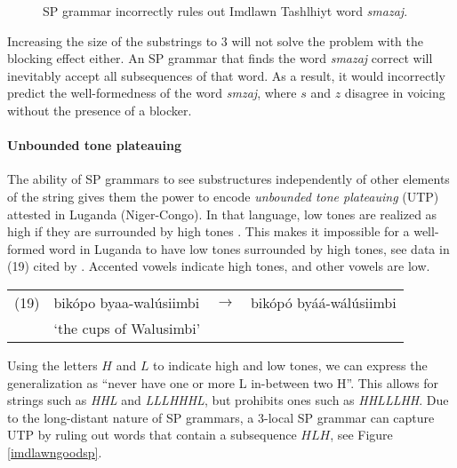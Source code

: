 \begin{figure}[h!]
\begin{center}
\end{center}
\caption{SP grammar incorrectly rules out Imdlawn Tashlhiyt word \emph{sm\textchi azaj}.}
\label{imdlawnbadsp}
\end{figure}

Increasing the size of the substrings to $3$ will not solve the problem with the blocking effect either.
An SP grammar that finds the word \emph{sm\textchi azaj} correct will inevitably accept all subsequences of that word.
As a result, it would incorrectly predict the well-formedness of the word \emph{smzaj}, where $s$ and $z$ disagree in voicing without the presence of a blocker.



\paragraph{Unbounded tone plateauing}
The ability of SP grammars to see substructures independently of other elements of the string gives them the power to encode \emph{unbounded tone plateauing} (UTP) attested in Luganda (Niger-Congo).
In that language, low tones are realized as high if they are surrounded by high tones \citep{HymanKatamba2010}.
This makes it impossible for a well-formed word in Luganda to have low tones surrounded by high tones, see data in (19) cited by \citep{Hyman2011,Jardine2016}.
Accented vowels indicate high tones, and other vowels are low.

\medskip
\begin{tabular}{llcl}
(19) & bik\'opo byaa-wal\'usiimbi & $\rightarrow$ & bik\'op\'o by\'a\'a-w\'al\'usiimbi \\
& `the cups of Walusimbi' &&
\end{tabular}
\medskip

Using the letters $H$ and $L$ to indicate high and low tones, we can express the generalization as ``never have one or more L in-between two H''.
This allows for strings such as \emph{HHL} and \emph{LLLHHHL}, but prohibits ones such as \emph{HHLLLHH}.
Due to the long-distant nature of SP grammars, a $3$-local SP grammar can capture UTP by ruling out words that contain a subsequence $HLH$, see Figure \ref{imdlawngoodsp}.

